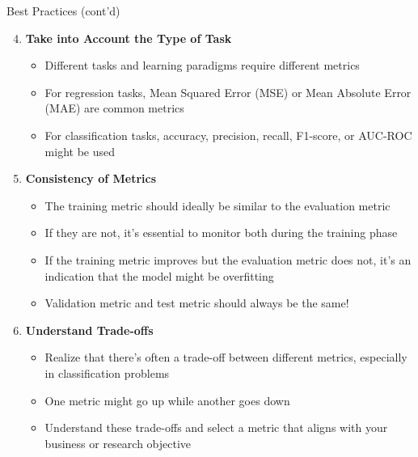 \documentclass[aspectratio=169]{../latex_main/tntbeamer}  %
\begin{document}
         \begin{frame}[c]{Best Practices (cont'd)}
	    \begin{enumerate}\setcounter{enumi}{3}
                \item \textbf{Take into Account the Type of Task}
                \begin{itemize}
                    \item Different tasks and learning paradigms require different metrics
                    \item For regression tasks, Mean Squared Error (MSE) or Mean Absolute Error (MAE) are common metrics
                    \item For classification tasks, accuracy, precision, recall, F1-score, or AUC-ROC might be used
                \end{itemize}
                \pause
                \item \textbf{Consistency of Metrics}
                \begin{itemize}
                    \item The training metric should ideally be similar to the evaluation metric
                    \item If they are not, it's essential to monitor both during the training phase
                    \item If the training metric improves but the evaluation metric does not, it's an indication that the model might be overfitting
                    \item Validation metric and test metric should always be the same!
                \end{itemize}
                \pause
                \item \textbf{Understand Trade-offs}
                \begin{itemize}
                    \item Realize that there's often a trade-off between different metrics, especially in classification problems
                    \item One metric might go up while another goes down
                    \item Understand these trade-offs and select a metric that aligns with your business or research objective
                \end{itemize}
	    \end{enumerate}

	\end{frame}
\end{document}
